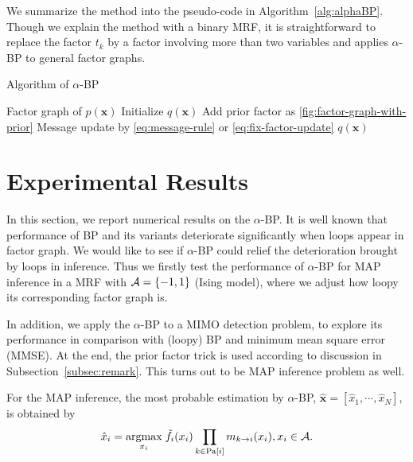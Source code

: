 \documentclass[conference,onecolumn]{IEEEtran}
\begin{document}
We summarize the method into the pseudo-code in Algorithm~\autoref{alg:alphaBP}. Though we explain the method with a binary MRF, it is straightforward to replace the factor $t_k$ by a factor involving more than two variables and applies $\alpha$-BP to general factor graphs.
\begin{algorithm}
  \caption{Algorithm of $\alpha$-BP}\label{alg:alphaBP}
  \begin{algorithmic}[1]
    \renewcommand{\algorithmicrequire}{\textbf{Input:}}
    \renewcommand{\algorithmicensure}{\textbf{Output:}}
    \REQUIRE Factor graph of $p(\bm{x})$
    \STATE Initialize $q(\bm{x})$
    \STATE Add prior factor as \autoref{fig:factor-graph-with-prior}
    \ENDIF
    \STATE Message update by \autoref{eq:message-rule} or \autoref{eq:fix-factor-update}
    \ENDFOR
    \ENDWHILE
    \RETURN $q(\bm{x})$ 
  \end{algorithmic} 
\end{algorithm}

\section{Experimental Results}
In this section, we report numerical results on the $\alpha$-BP. It is well known that performance of BP and its variants deteriorate significantly when loops appear in factor graph. We would like to see if $\alpha$-BP could relief the deterioration brought by loops in inference. Thus we firstly test the performance of $\alpha$-BP for MAP inference in a MRF with $\mathcal{A}=\{-1,1\}$ (Ising model), where we adjust how loopy its corresponding factor graph is.

In addition, we apply the $\alpha$-BP to a MIMO detection problem, to explore its performance in comparison with (loopy) BP and minimum mean square error (MMSE). At the end, the prior factor trick is used according to discussion in Subsection~\ref{subsec:remark}. This turns out to be MAP inference problem as well.

For the MAP inference, the most probable estimation by $\alpha$-BP, $\hat{\bm{x}}=[\hat{x}_1, \cdots, \hat{x}_N]$, is obtained by
\begin{align}
  \hat{x}_{i} = \underset{x_i}{\operatorname{argmax}}\;\tilde{f}_i(x_i) \prod_{k\in \text{Pa}[i]} m_{k\rightarrow i}(x_i), x_i \in \mathcal{A}.
\end{align}
\end{document}
